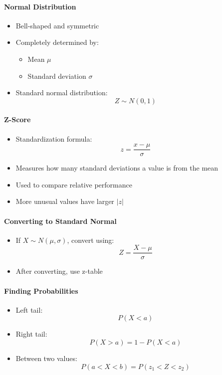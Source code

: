 \documentclass{article}
\begin{document}
\paragraph{Normal Distribution}

\begin{itemize}
    \item Bell-shaped and symmetric
    \item Completely determined by:
    \begin{itemize}
        \item Mean $\mu$
        \item Standard deviation $\sigma$
    \end{itemize}
    \item Standard normal distribution:
    \[
    Z \sim N(0,1)
    \]
\end{itemize}

\paragraph{Z-Score}

\begin{itemize}
    \item Standardization formula:
    \[
    z = \frac{x - \mu}{\sigma}
    \]
    \item Measures how many standard deviations a value is from the mean
    \item Used to compare relative performance
    \item More unusual values have larger $|z|$
\end{itemize}


\paragraph{Converting to Standard Normal}

\begin{itemize}
    \item If $X \sim N(\mu, \sigma)$, convert using:
    \[
    Z = \frac{X - \mu}{\sigma}
    \]
    \item After converting, use z-table
\end{itemize}

\paragraph{Finding Probabilities}

\begin{itemize}
    \item Left tail:
    \[
    P(X < a)
    \]
    \item Right tail:
    \[
    P(X > a) = 1 - P(X < a)
    \]
    \item Between two values:
    \[
    P(a < X < b) = P(z_1 < Z < z_2)
    \]
\end{itemize}
\end{document}
